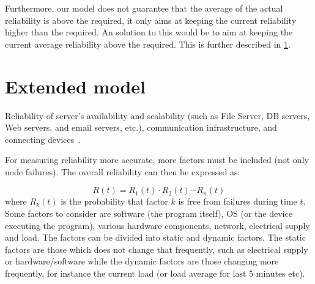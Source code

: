 \documentclass{cslthse-msc}
\begin{document}
Furthermore, our model does not guarantee that the average of the actual reliability is above the required, it only aims at keeping the current reliability higher than the required. An solution to this would be to aim at keeping the current average reliability above the required. This is further described in \cref{subsec:future_extended_model}. 

\section{Extended model} \label{subsec:future_extended_model}
Reliability of server’s availability and scalability (such as File Server, DB servers, Web servers, and email servers, etc.), communication infrastructure, and connecting devices~\cite{surveyReliabilityDistr}.

For measuring reliability more accurate, more factors must be included (not only node failures). The overall reliability can then be expressed as:

\begin{equation} \label{eq:overall_reliability}
R(t) = R_{1}(t) \cdot R_{2}(t) \cdots R_{n}(t)
\end{equation}
where $R_{k}(t)$ is the probability that factor $k$ is free from failures during time $t$. Some factors to consider are software (the program itself), OS (or the device executing the program), various hardware components, network, electrical supply and load. The factors can be divided into static and dynamic factors. The static factors are those which does not change that frequently, such as electrical supply or hardware/software while the dynamic factors are those changing more frequently, for instance the current load (or load average for last 5 minutes etc). 
\end{document}
